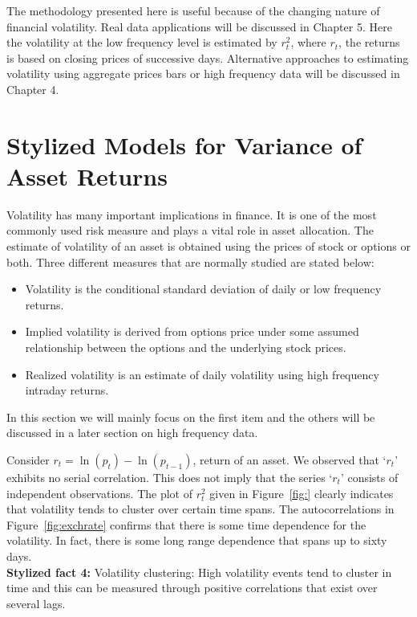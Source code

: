 The methodology presented here is useful because of the changing nature of financial volatility. Real data applications will be discussed in Chapter 5. Here the volatility at the low frequency level is estimated by $r_t^2$, where $r_t$, the returns is based on closing prices of successive days. Alternative approaches to estimating volatility using aggregate prices bars or high frequency data will be discussed in Chapter 4. 


\section{Stylized Models for Variance of Asset Returns}


Volatility has many important implications in finance. It is one of the most commonly
used risk measure and plays a vital role in asset allocation. The estimate of volatility of an asset is obtained using the prices of stock or options or both. Three different measures that are normally studied are stated below:
\begin{itemize}
\item Volatility is the conditional standard deviation of daily or low frequency returns.

\item Implied volatility is derived from options price under some assumed
relationship between the options and the underlying stock prices.

\item Realized volatility is an estimate of daily volatility using high frequency
intraday returns.
\end{itemize}
In this section we will mainly focus on the first item and the others will be discussed in a later section on high frequency data.


Consider $r_t = \ln{(p_t) - \ln{(p_{t-1})}}$, return of an asset. We observed that `$r_t$' exhibits no serial correlation. This does not imply that the series `$r_t$' consists of independent observations. The plot of $r_t^2$ given in Figure~\ref{fig:} clearly indicates that volatility tends to cluster over certain time spans. The autocorrelations in Figure~\ref{fig:exchrate} confirms that there is some time dependence for the volatility. In fact, there is some long range dependence that spans up to sixty days. \\


\noindent\textbf{Stylized fact 4:} Volatility clustering: High volatility events tend to cluster in time and this can be measured through positive correlations that exist over several lags.


